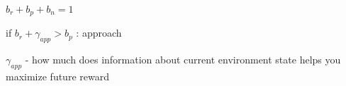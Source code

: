 $b_{r} + b_{p} + b_{n} = 1$

if $b_{r} + \gamma_{app} > b_{p}$ : approach

$\gamma_{app}$ - how much does information about current environment state helps you maximize future reward